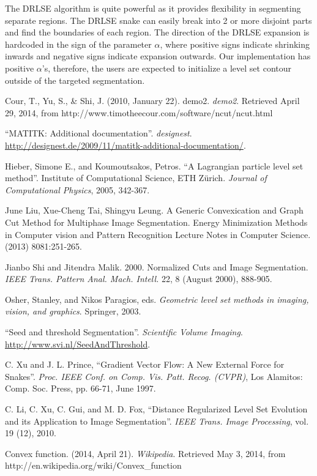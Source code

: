 \documentclass{article}
\begin{document}
The DRLSE algorithm is quite powerful as it provides flexibility in segmenting separate regions. The DRLSE snake can easily break into 2 or more disjoint parts and find the boundaries of each region. The direction of the DRLSE expansion is hardcoded in the sign of the parameter $\alpha$, where positive signs indicate shrinking inwards and negative signs indicate expansion outwards. Our implementation has positive $\alpha$'s, therefore, the users are expected to initialize a level set contour outside of the targeted segmentation.



\clearpage
\begin{thebibliography}{9}
\fontsize{10pt}{12pt}\selectfont
\raggedright

        Cour, T., Yu, S., \& Shi, J. (2010, January 22). demo2. \emph{demo2}. Retrieved April 29, 2014, from http://www.timotheecour.com/software/ncut/ncut.html

        ``MATITK: Additional documentation''.
        \emph{designest}.
        \url{http://designest.de/2009/11/matitk-additional-documentation/}.

        Hieber, Simone E., and Koumoutsakos, Petros.
        ``A Lagrangian particle level set method''.
        Institute of Computational Science, ETH Zürich.
        \emph{Journal of Computational Physics}, 2005, 342-367.

        June Liu, Xue-Cheng Tai, Shingyu Leung. A Generic Convexication and Graph Cut Method for Multiphase Image Segmentation. Energy Minimization Methods in Computer vision and Pattern Recognition Lecture Notes in Computer Science. (2013) 8081:251-265.

        Jianbo Shi and Jitendra Malik. 2000. Normalized Cuts and Image Segmentation. \emph{IEEE Trans. Pattern Anal. Mach. Intell.} 22, 8 (August 2000), 888-905.

        Osher, Stanley, and Nikos Paragios, eds. 
        \emph{Geometric level set methods in imaging, vision, and graphics}.
        Springer, 2003.

        ``Seed and threshold Segmentation''.
        \emph{Scientific Volume Imaging}.
        \url{http://www.svi.nl/SeedAndThreshold}.

        C. Xu and J. L. Prince, ``Gradient Vector Flow: A New External Force for Snakes''.
        \emph{Proc. IEEE Conf. on Comp. Vis. Patt. Recog. (CVPR)}, 
        Los Alamitos: Comp. Soc. Press, pp. 66-71, June 1997.

        C. Li, C. Xu, C. Gui, and M. D. Fox, 
        ``Distance Regularized Level Set Evolution and its Application to Image Segmentation''.
        \emph{IEEE Trans. Image Processing}, 
        vol. 19 (12), 2010.
        
        Convex function. (2014, April 21). \emph{Wikipedia}. Retrieved May 3, 2014, from http://en.wikipedia.org/wiki/Convex\_function        

\end{thebibliography}
\end{document}
